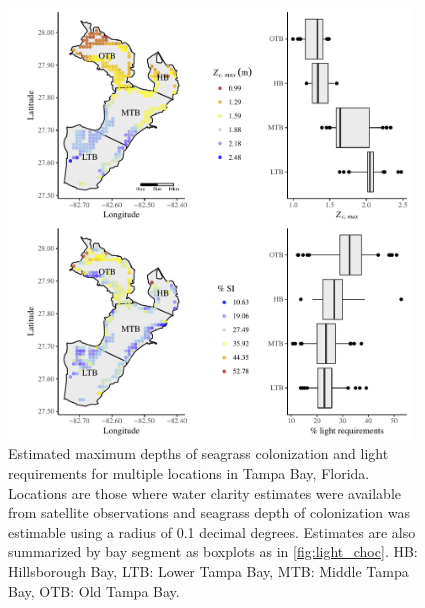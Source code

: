 \documentclass[letterpaper,12pt,oneside]{article}\usepackage[]{graphicx}\usepackage[]{color}
\begin{document}
\begin{figure}
\centering
\includegraphics[width = 0.95\textwidth]{figs/FigS3.pdf}
\caption{Estimated maximum depths of seagrass colonization and light requirements for multiple locations in Tampa Bay, Florida. Locations are those where water clarity estimates were available from satellite observations and seagrass depth of colonization was estimable using a radius of 0.1 decimal degrees.  Estimates are also summarized by bay segment as boxplots as in \cref{fig:light_choc}. HB: Hillsborough Bay, LTB: Lower Tampa Bay, MTB: Middle Tampa Bay, OTB: Old Tampa Bay.}
\label{fig:light_tb_zcmax}
\end{figure}

\end{document}
